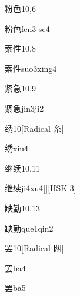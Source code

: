 \begin{entry}{粉色}{10,6}
  \begin{phonetics}{粉色}{fen3 se4}
  \end{phonetics}
\end{entry}

\begin{entry}{索性}{10,8}
  \begin{phonetics}{索性}{suo3xing4}
  \end{phonetics}
\end{entry}

\begin{entry}{紧急}{10,9}
  \begin{phonetics}{紧急}{jin3ji2}
  \end{phonetics}
\end{entry}

\begin{entry}{绣}{10}[Radical 糸]
  \begin{phonetics}{绣}{xiu4}
  \end{phonetics}
\end{entry}

\begin{entry}{继续}{10,11}
  \begin{phonetics}{继续}{ji4xu4}[][HSK 3]
  \end{phonetics}
\end{entry}

\begin{entry}{缺勤}{10,13}
  \begin{phonetics}{缺勤}{que1qin2}
  \end{phonetics}
\end{entry}

\begin{entry}{罢}{10}[Radical 网]
  \begin{phonetics}{罢}{ba4}
  \end{phonetics}
  \begin{phonetics}{罢}{ba5}
  \end{phonetics}
\end{entry}

